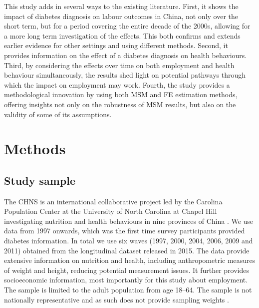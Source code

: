 
This study adds in several ways to the existing literature. First, it shows the impact of diabetes diagnosis on labour outcomes in China, not only over the short term, but for a period covering the entire decade of the 2000s, allowing for a more long term investigation of the effects. This both confirms and extends earlier evidence for other settings and using different methods. Second, it provides information on the effect of a diabetes diagnosis on health behaviours. Third, by considering the effects over time on both employment and health behaviour simultaneously, the results shed light on potential pathways through which the impact on employment may work.  Fourth, the study provides a methodological innovation by using both \ac{MSM} and \ac{FE} estimation methods, offering insights not only on the robustness of \ac{MSM} results, but also on the validity of some of its assumptions.  


\section{\label{sec:Methods5}Methods}

\subsection{Study sample}


The \ac{CHNS} is an international collaborative project led by the Carolina Population Center at the University of North Carolina at Chapel Hill investigating nutrition and health behaviours in nine provinces of China \parencite{Zhang2014d}. We use data from 1997 onwards, which was the first time survey participants provided diabetes information. In total we use six waves (1997, 2000, 2004, 2006, 2009 and 2011) obtained from the longitudinal dataset released in 2015. The data provide extensive information on nutrition and health, including anthropometric measures of weight and height, reducing potential measurement issues. It further provides socioeconomic information, most importantly for this study about employment. The sample is limited to the adult population from age 18--64.  The sample is not nationally representative and as such does not provide sampling weights  \parencite{Popkin2010}.

